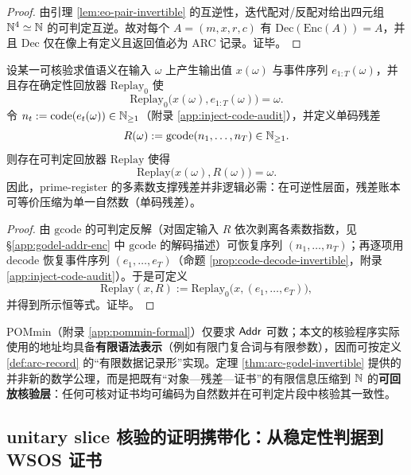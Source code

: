 \begin{proof}
由引理 \ref{lem:eo-pair-invertible} 的互逆性，迭代配对/反配对给出四元组 $\mathbb{N}^4\simeq\mathbb{N}$ 的可判定互逆。故对每个 $A=(m,x,r,c)$ 有 $\mathrm{Dec}(\mathrm{Enc}(A))=A$，并且 $\mathrm{Dec}$ 仅在像上有定义且返回值必为 ARC 记录。证毕。
\end{proof}

\begin{theorem}[残差账本的单码压缩与回放等价]\label{thm:singlecode-ledger-replay}
设某一可核验求值语义在输入 $\omega$ 上产生输出值 $x(\omega)$ 与事件序列 $e_{1:T}(\omega)$，并且存在确定性回放器 $\mathrm{Replay}_0$ 使
$$
\mathrm{Replay}_0\bigl(x(\omega),e_{1:T}(\omega)\bigr)=\omega.
$$
令 $n_t:=\mathrm{code}(e_t(\omega))\in\mathbb{N}_{\ge 1}$（附录 \ref{app:inject-code-audit}），并定义单码残差
$$
R(\omega):=\mathrm{gcode}(n_1,\dots,n_T)\in\mathbb{N}_{\ge 1}.
$$
则存在可判定回放器 $\mathrm{Replay}$ 使得
$$
\mathrm{Replay}\bigl(x(\omega),R(\omega)\bigr)=\omega.
$$
因此，prime-register 的多素数支撑残差并非逻辑必需：在可逆性层面，残差账本可等价压缩为单一自然数（单码残差）。
\end{theorem}

\begin{proof}
由 $\mathrm{gcode}$ 的可判定反解（对固定输入 $R$ 依次剥离各素数指数，见 \S\ref{app:godel-addr-enc} 中 $\mathrm{gcode}$ 的解码描述）可恢复序列 $(n_1,\dots,n_T)$；再逐项用 $\mathrm{decode}$ 恢复事件序列 $(e_1,\dots,e_T)$（命题 \ref{prop:code-decode-invertible}，附录 \ref{app:inject-code-audit}）。于是可定义
$$
\mathrm{Replay}(x,R):=\mathrm{Replay}_0\bigl(x,(e_1,\dots,e_T)\bigr),
$$
并得到所示恒等式。证毕。
\end{proof}

\begin{remark}
POMmin（附录 \ref{app:pommin-formal}）仅要求 $\mathsf{Addr}$ 可数；本文的核验程序实际使用的地址均具备\textbf{有限语法表示}（例如有限门复合词与有限参数），因而可按定义 \ref{def:arc-record} 的“有限数据记录形”实现。定理 \ref{thm:arc-godel-invertible} 提供的并非新的数学公理，而是把既有“对象—残差—证书”的有限信息压缩到 $\mathbb{N}$ 的\textbf{可回放核验层}：任何可核对证书均可编码为自然数并在可判定片段中核验其一致性。
\end{remark}

\subsection{unitary slice 核验的证明携带化：从稳定性判据到 WSOS 证书}\label{app:wsos-proof-carrying}

